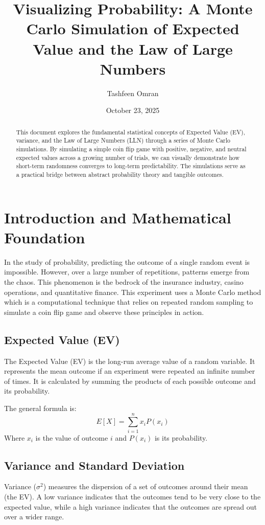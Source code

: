 \documentclass[12pt]{article}
\title{Visualizing Probability: A Monte Carlo Simulation of Expected Value and the Law of Large Numbers}
\author{Tashfeen Omran}
\date{October 23, 2025}
\begin{document}
\maketitle

\begin{abstract}
This document explores the fundamental statistical concepts of Expected Value (EV), variance, and the Law of Large Numbers (LLN) through a series of Monte Carlo simulations. By simulating a simple coin flip game with positive, negative, and neutral expected values across a growing number of trials, we can visually demonstrate how short-term randomness converges to long-term predictability. The simulations serve as a practical bridge between abstract probability theory and tangible outcomes.
\end{abstract}

\tableofcontents
\clearpage

\section{Introduction and Mathematical Foundation}

In the study of probability, predicting the outcome of a single random event is impossible. However, over a large number of repetitions, patterns emerge from the chaos. This phenomenon is the bedrock of the insurance industry, casino operations, and quantitative finance. This experiment uses a Monte Carlo method which is a computational technique that relies on repeated random sampling to simulate a coin flip game and observe these principles in action.

\subsection{Expected Value (EV)}
The Expected Value (EV) is the long-run average value of a random variable. It represents the mean outcome if an experiment were repeated an infinite number of times. It is calculated by summing the products of each possible outcome and its probability.

The general formula is:
\[
E[X] = \sum_{i=1}^{n} x_i P(x_i)
\]
Where $x_i$ is the value of outcome $i$ and $P(x_i)$ is its probability.

\subsection{Variance and Standard Deviation}
Variance ($\sigma^2$) measures the dispersion of a set of outcomes around their mean (the EV). A low variance indicates that the outcomes tend to be very close to the expected value, while a high variance indicates that the outcomes are spread out over a wider range.
\end{document}
